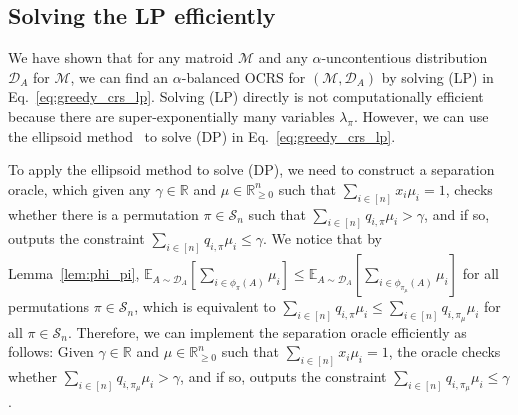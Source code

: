 \documentclass[11pt]{article}
\newcommand{\D}{\mathcal D}
\def \E {\mathbb{E}}
\newcommand{\M}{{\mathcal M}}
\newcommand{\cS}{{\mathcal S}}
\newcommand{\R}{{\mathbb R}}
\begin{document}
\subsection{Solving the LP efficiently}\label{subsec:solving_greedy_crs_lp}
We have shown that for any matroid $\M$ and any $\alpha$-uncontentious distribution $\D_A$ for $\M$, we can find an $\alpha$-balanced OCRS for $(\M,\D_A)$ by solving (LP) in Eq.~\eqref{eq:greedy_crs_lp}. Solving (LP) directly is not computationally efficient because there are super-exponentially many variables $\lambda_{\pi}$. However, we can use the ellipsoid method~\citep{grotschel2012geometric} to solve (DP) in Eq.~\eqref{eq:greedy_crs_lp}.

To apply the ellipsoid method to solve (DP), we need to construct a separation oracle, which given any $\gamma\in\R$ and $\mu\in\R_{\ge0}^n$ such that $\sum_{i\in[n]}x_i\mu_i=1$, checks whether there is a permutation $\pi\in\cS_n$ such that $\sum_{i\in[n]} q_{i,\pi}\mu_i>\gamma$, and if so, outputs the constraint $\sum_{i\in[n]} q_{i,\pi}\mu_i\le\gamma$. We notice that by Lemma~\ref{lem:phi_pi}, $\E_{A\sim\D_A}[\sum_{i\in\phi_{\pi}(A)} \mu_i]\le\E_{A\sim\D_A}[\sum_{i\in\phi_{\pi_{\mu}}(A)} \mu_i]$ for all permutations $\pi\in\cS_n$, which is equivalent to $\sum_{i\in[n]} q_{i,\pi}\mu_i\le\sum_{i\in[n]} q_{i,\pi_{\mu}}\mu_i$ for all $\pi\in\cS_n$. Therefore, we can implement the separation oracle efficiently as follows: Given $\gamma\in\R$ and $\mu\in\R_{\ge0}^n$ such that $\sum_{i\in[n]}x_i\mu_i=1$, the oracle checks whether $\sum_{i\in[n]} q_{i,\pi_{\mu}}\mu_i>\gamma$, and if so, outputs the constraint $\sum_{i\in[n]} q_{i,\pi_{\mu}}\mu_i\le\gamma$.
\end{document}
